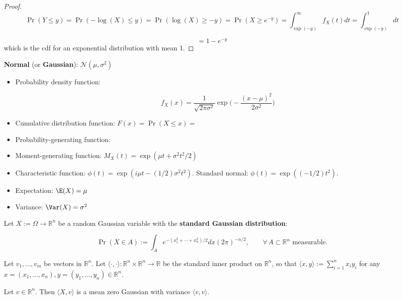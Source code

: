 \begin{proof}
\[
\Pr(Y \leq y) = \Pr(- \log(X) \leq y) = \Pr( \log(X) \geq -y)  = \Pr(X \geq e^{-y}) = \int_{\exp(-y)}^\infty f_X(t) dt = \int_{\exp(-y)}^1 dt
\]



\[
= 1 - e^{- y}
\]
which is the cdf for an exponential distribution with mean 1.
\end{proof}

\textbf{Normal} (or \textbf{Gaussian}): \(\mathcal{N}(\mu, \sigma^2)\)

\begin{itemize}

\item Probability density function:

\[
f_X(x) = \frac{1}{\sqrt{2 \pi \sigma^2}} \exp \bigg( - \frac{(x-\mu)^2}{2 \sigma^2}\bigg)
\]

\item Cumulative distribution function: \(F(x) = \Pr(X \leq x) = \)

\item Probability-generating function:

\item Moment-generating function: \(M_X(t) = \exp (\mu t + \sigma^2 t^2/2) \)

\item Characteristic function: \(\phi(t) = \exp(i\mu t - (1/2) \sigma^2t^2)\). Standard normal: \(\phi(t) = \exp((-1/2)t^2)\).

\item Expectation: \(\E(X) = \mu\)

\item Variance: \(\Var(X) = \sigma^2 \)

\end{itemize}

\begin{theorem}\label{prob.thm.sums.gaussian} Let $X := \Omega\to\mathbb{R}^{n}$ be a random Gaussian variable with the \textbf{standard Gaussian distribution}:

$$\Pr(X\in A):=\int_{A}e^{-(x_{1}^{2}+\cdots+x_{n}^{2})/2}dx(2\pi)^{-n/2},\qquad\forall\, A\subset\mathbb{R}^{n}\,\,\mathrm{measurable}.$$

Let $v_1,\dots,v_m$ be vectors in $\mathbb{R}^{n}$.  Let $\langle\cdot, \cdot\rangle: \mathbb{R}^{n} \times \mathbb{R}^{n} \to\mathbb{R}$ be the standard inner product on $\mathbb{R}^{n}$, so that $\langle x,y\rangle:=\sum_{i=1}^{n}x_{i}y_{i}$ for any $x=(x_{1},\ldots,x_{n}),y=(y_{1},\ldots,y_{n})\in\mathbb{R}^{n}$.

Let $v\in\mathbb{R}^{n}$. Then $\langle X, v\rangle$ is a mean zero Gaussian with variance $\langle v,v\rangle$.


 \end{theorem}
 
